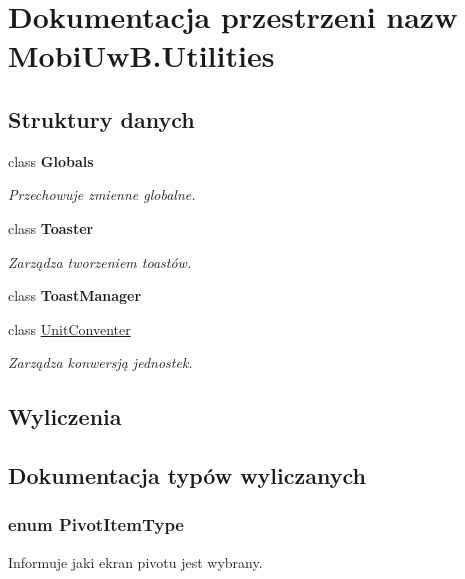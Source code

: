 \hypertarget{a00274}{}\section{Dokumentacja przestrzeni nazw Mobi\+Uw\+B.\+Utilities}
\label{a00274}
\subsection*{Struktury danych}
\begin{DoxyCompactItemize}
\item 
class {\bfseries Globals}
\begin{DoxyCompactList}\small\item\em Przechowuje zmienne globalne. \end{DoxyCompactList}\item 
class {\bfseries Toaster}
\begin{DoxyCompactList}\small\item\em Zarządza tworzeniem toast\textquotesingle{}ów. \end{DoxyCompactList}\item 
class {\bfseries Toast\+Manager}
\item 
class \hyperlink{a00077}{Unit\+Conventer}
\begin{DoxyCompactList}\small\item\em Zarządza konwersją jednostek. \end{DoxyCompactList}\end{DoxyCompactItemize}
\subsection*{Wyliczenia}


\subsection{Dokumentacja typów wyliczanych}
\hypertarget{a00274_a23511696d57170a5e73bc96c4906df92}{}
\subsubsection[{Pivot\+Item\+Type}]{\setlength{\rightskip}{0pt plus 5cm}enum Pivot\+Item\+Type\hspace{0.3cm}{\ttfamily [strong]}}\label{a00274_a23511696d57170a5e73bc96c4906df92}


Informuje jaki ekran pivot\textquotesingle{}u jest wybrany. 


